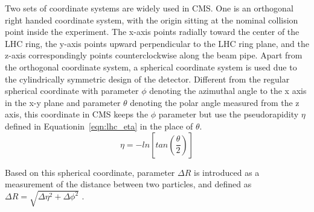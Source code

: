 \vspace{0.3cm}
Two sets of coordinate systems are widely used in CMS. One is an orthogonal right handed coordinate system, with the origin sitting at the nominal collision point inside the experiment. The x-axis points radially toward the center of the LHC ring, the y-axis points upward perpendicular to the LHC ring plane, and the z-axis correspondingly points counterclockwise along the beam pipe. Apart from the orthogonal coordinate system, a spherical coordinate system is used due to the cylindrically symmetric design of the detector. Different from the regular spherical coordinate with parameter $\phi$ denoting the azimuthal angle to the x axis in the x-y plane and parameter $\theta$ denoting the polar angle measured from the z axis, this coordinate in CMS keeps the $\phi$ parameter but use the pseudorapidity $\eta$ defined in Equationin~\ref{eqn:lhc_eta} in the place of $\theta$.
\begin{equation}
\eta = -ln[tan(\frac{\theta}{2})]
\label{eqn:lhc_eta}
\end{equation}

Based on this spherical coordinate, parameter $\Delta R$ is introduced as a measurement of the distance between two particles, and defined as $\Delta R=\sqrt{\Delta\eta^2 + \Delta\phi^2}$
.
